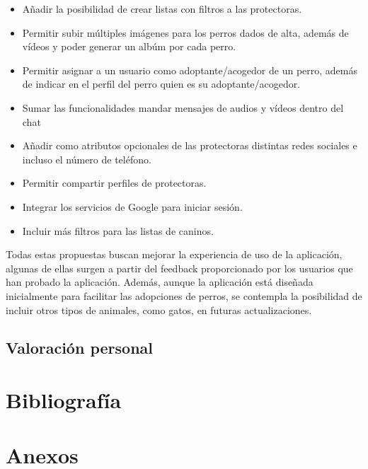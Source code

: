 \documentclass[a4paper, 12pt]{article}
\begin{document}
\begin{itemize}[noitemsep]
	\item Añadir la posibilidad de crear listas con filtros a las protectoras.
	\item Permitir subir múltiples imágenes para los perros dados de alta, además de vídeos y poder generar un albúm por cada perro.
	\item Permitir asignar a un usuario como adoptante/acogedor de un perro, además de indicar en el perfil del perro quien es su adoptante/acogedor.
	\item Sumar las funcionalidades mandar mensajes de audios y vídeos dentro del chat
	\item Añadir como atributos opcionales de las protectoras distintas redes sociales e incluso el número de teléfono.
	\item Permitir compartir perfiles de protectoras.
	\item Integrar los servicios de Google para iniciar sesión.
	\item Incluir más filtros para las listas de caninos.
\end{itemize}

Todas estas propuestas buscan mejorar la experiencia de uso de la aplicación, algunas de ellas surgen a partir del feedback proporcionado por los usuarios que han probado la aplicación. Además, aunque la aplicación está diseñada inicialmente para facilitar las adopciones de perros, se contempla la posibilidad de incluir otros tipos de animales, como gatos, en futuras actualizaciones.

\subsection{Valoración personal}


\newpage
\section{Bibliografía}


\newpage
\section{Anexos}

\printindex
\end{document}
